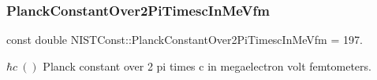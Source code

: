\subsubsection{\texorpdfstring{Planck\+Constant\+Over2\+Pi\+Timesc\+In\+Me\+Vfm}{PlanckConstantOver2PiTimescInMeVfm}}
{\footnotesize\ttfamily const double N\+I\+S\+T\+Const\+::\+Planck\+Constant\+Over2\+Pi\+Timesc\+In\+Me\+Vfm = 197.}

$\hbar c \ ()$ Planck constant over 2 pi times c in megaelectron volt femtometers. 